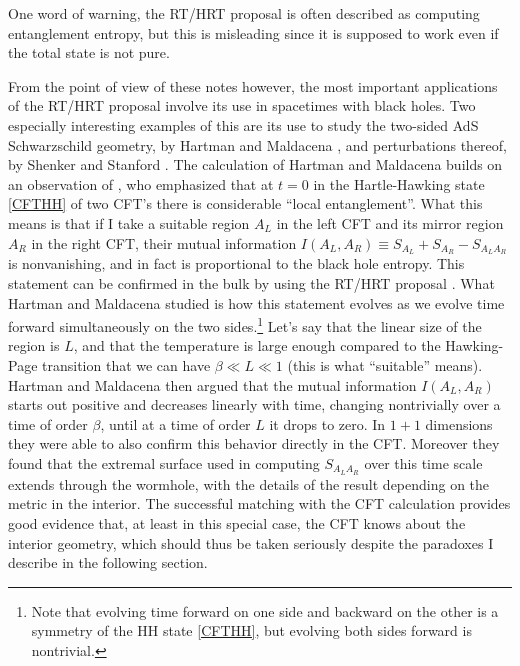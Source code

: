 \documentclass[12pt]{article}
\begin{document}
One word of warning, the RT/HRT proposal is often described as computing entanglement entropy, but this is misleading since it is supposed to work even if the total state is not pure.

From the point of view of these notes however, the most important applications of the RT/HRT proposal involve its use in spacetimes with black holes.  Two especially interesting examples of this are its use to study the two-sided AdS Schwarzschild geometry, by Hartman and Maldacena \cite{Hartman:2013qma}, and perturbations thereof, by Shenker and Stanford \cite{Shenker:2013pqa,Shenker:2013yza}.  The calculation of Hartman and Maldacena builds on an observation of \cite{Morrison:2012iz}, who emphasized that at $t=0$ in the Hartle-Hawking state \eqref{CFTHH} of two CFT's there is considerable ``local entanglement''.  What this means is that if I take a suitable region $A_L$ in the left CFT and its mirror region $A_R$ in the right CFT, their mutual information $I(A_L,A_R)\equiv S_{A_L}+S_{A_R}-S_{A_LA_R}$ is nonvanishing, and in fact is proportional to the black hole entropy.  This statement can be confirmed in the bulk by using the RT/HRT proposal \cite{Morrison:2012iz}.  What Hartman and Maldacena studied is how this statement evolves as we evolve time forward simultaneously on the two sides.\footnote{Note that evolving time forward on one side and backward on the other is a symmetry of the HH state \eqref{CFTHH}, but evolving both sides forward is nontrivial.}  Let's say that the linear size of the region is $L$, and that the temperature is large enough compared to the Hawking-Page transition that we can have $\beta\ll L\ll 1$ (this is what ``suitable'' means).  Hartman and Maldacena then argued that the mutual information $I(A_L,A_R)$ starts out positive and decreases linearly with time, changing nontrivially over a time of order $\beta$, until at a time of order $L$ it drops to zero.  In $1+1$ dimensions they were able to also confirm this behavior directly in the CFT.  Moreover they found that the extremal surface used in computing $S_{A_L A_R}$ over this time scale extends through the wormhole, with the details of the result depending on the metric in the interior.  The successful matching with the CFT calculation provides good evidence that, at least in this special case, the CFT knows about the interior geometry, which should thus be taken seriously despite the paradoxes I describe in the following section.  
\end{document}
